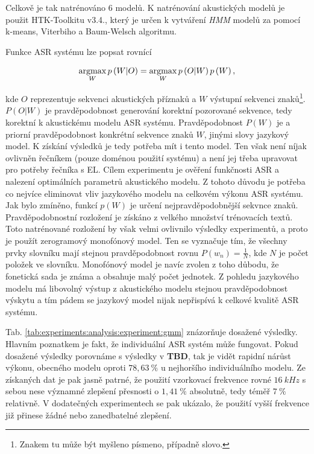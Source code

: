 Celkově je tak natrénováno $6$ modelů. K natrénování akustických modelů je použit HTK-Toolkitu v3.4., který je určen k vytváření \textit{HMM} modelů za pomocí k-means, Viterbiho a Baum-Welsch algoritmu.

Funkce ASR systému lze popsat rovnící

\begin{equation}
  \operatorname*{argmax}_W p\left(W | O\right) = \operatorname*{argmax}_W p\left(O | W\right) p\left(W\right),
\end{equation}

\noindent kde $O$ reprezentuje sekvenci akustických příznaků a $W$ výstupní sekvenci znaků\footnote{Znakem tu může být myšleno písmeno, případně slovo.}. $P\left(O | W\right)$ je pravděpodobnost generování korektní pozorované sekvence, tedy korektní k akustickému modelu ASR systému. Pravděpodobnost $P\left(W\right)$ je a priorní pravděpodobnost konkrétní sekvence znaků $W$, jinými slovy jazykový model. K získání výsledků je tedy potřeba mít i tento model. Ten však není níjak ovlivněn řečníkem (pouze doménou použití systému) a není jej třeba upravovat pro potřeby řečníka s EL. Cílem experimentu je ověření funkčnosti ASR a nalezení optimálních parametrů akustického modelu. Z tohoto důvodu je potřeba co nejvíce eliminovat vliv jazykového modelu na celkovém výkonu ASR systému. Jak bylo zmíněno, funkcí $p\left(W\right)$ je určení nejpravděpodobnější sekvnce znaků. Pravděpodobnostní rozložení je získáno z velkého množství trénovacích textů. Toto natrénované rozložení by však velmi ovlivnilo výsledky experimentů, a proto je použít zerogramový monofónový model. Ten se vyznačuje tím, že všechny prvky slovníku mají stejnou pravděpodobnost rovnu $P(w_n) = \frac{1}{N}$, kde $N$ je počet položek ve slovníku. Monofónový model je navíc zvolen z toho důbodu, že fonetická sada je známa a obsahuje malý počet jednotek. Z pohledu jazykového modelu má libovolný výstup z akustického modelu stejnou pravděpodobnost výskytu a tím pádem se jazykový model nijak nepřispívá k celkové kvalitě ASR systému.

Tab. \ref{tab:experiments:analysis:experiment:gmm} znázorňuje dosažené výsledky. Hlavním poznatkem je fakt, že individuální ASR systém může fungovat. Pokud dosažené výsledky porovnáme s výsledky v \textbf{TBD}, tak je vidět rapidní nárůst výkonu,  obecného modelu oproti $78,63\ \%$ u nejhoršího individuálního modelu. Ze získaných dat je pak jasně patrné, že použití vzorkovací frekvence rovné $16\ kHz$ s sebou nese významné zlepšení přesnosti o $1,41\ \%$ absolutně, tedy téměř $7\ \%$ relativně. V dodatečných experimentech se pak ukázalo, že použití vyšší frekvence již přinese žádné nebo zanedbatelné zlepšení.

